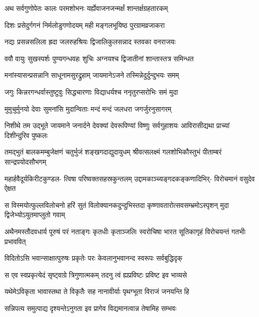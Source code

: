 

\twolineshloka
{अथ सर्वगुणोपेतः कालः परमशोभनः}
{यर्ह्येवाजनजन्मर्क्षं शान्तर्क्षग्रहतारकम्} %

\twolineshloka
{दिशः प्रसेदुर्गगनं निर्मलोडुगणोदयम्}
{मही मङ्गलभूयिष्ठ पुरग्रामव्रजाकरा} %

\twolineshloka
{नद्यः प्रसन्नसलिला ह्रदा जलरुहश्रियः}
{द्विजालिकुलसन्नाद स्तवका वनराजयः} %

\twolineshloka
{ववौ वायुः सुखस्पर्शः पुण्यगन्धवहः शुचिः}
{अग्नयश्च द्विजातीनां शान्तास्तत्र समिन्धत} %

\twolineshloka
{मनांस्यासन्प्रसन्नानि साधूनामसुरद्रुहाम्}
{जायमानेऽजने तस्मिन्नेदुर्दुन्दुभयः समम्} %

\twolineshloka
{जगुः किन्नरगन्धर्वास्तुष्टुवुः सिद्धचारणाः}
{विद्याधर्यश्च ननृतुरप्सरोभिः समं मुदा} %

\twolineshloka
{मुमुचुर्मुनयो देवाः सुमनांसि मुदान्विताः}
{मन्दं मन्दं जलधरा जगर्जुरनुसागरम्} %

\threelineshloka
{निशीथे तम उद्भूते जायमाने जनार्दने}
{देवक्यां देवरूपिण्यां विष्णुः सर्वगुहाशयः}
{आविरासीद्यथा प्राच्यां दिशीन्दुरिव पुष्कलः}

\fourlineindentedshloka
{तमद्भुतं बालकमम्बुजेक्षणं}
{चतुर्भुजं शङ्खगदाद्युदायुधम्}
{श्रीवत्सलक्ष्मं गलशोभिकौस्तुभं}
{पीताम्बरं सान्द्रपयोदसौभगम्} %

\fourlineindentedshloka
{महार्हवैदूर्यकिरीटकुण्डल-}
{त्विषा परिष्वक्तसहस्रकुन्तलम्}
{उद्दामकाञ्च्यङ्गदकङ्कणादिभिर्-}
{विरोचमानं वसुदेव ऐक्षत} %

\fourlineindentedshloka
{स विस्मयोत्फुल्लविलोचनो हरिं}
{सुतं विलोक्यानकदुन्दुभिस्तदा}
{कृष्णावतारोत्सवसम्भ्रमोऽस्पृशन्}
{मुदा द्विजेभ्योऽयुतमाप्लुतो गवाम्} %

\fourlineindentedshloka
{अथैनमस्तौदवधार्य पूरुषं}
{परं नताङ्गः कृतधीः कृताञ्जलिः}
{स्वरोचिषा भारत सूतिकागृहं}
{विरोचयन्तं गतभीः प्रभाववित्} %



\twolineshloka
{विदितोऽसि भवान्साक्षात्पुरुषः प्रकृतेः परः}
{केवलानुभवानन्द स्वरूपः सर्वबुद्धिदृक्} %

\twolineshloka
{स एव स्वप्रकृत्येदं सृष्ट्वाग्रे त्रिगुणात्मकम्}
{तदनु त्वं ह्यप्रविष्टः प्रविष्ट इव भाव्यसे} %

\twolineshloka
{यथेमेऽविकृता भावास्तथा ते विकृतैः सह}
{नानावीर्याः पृथग्भूता विराजं जनयन्ति हि} %

\twolineshloka
{सन्निपत्य समुत्पाद्य दृश्यन्तेऽनुगता इव}
{प्रागेव विद्यमानत्वान्न तेषामिह सम्भवः} %

